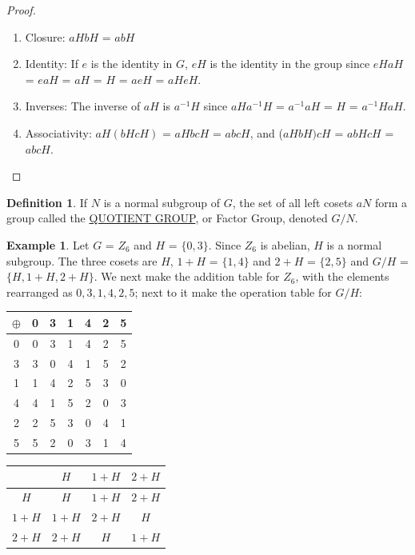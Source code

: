 \documentclass[12pt]{book}
\theoremstyle{definition}
\newtheorem{definition}{Definition}
\newtheorem{example}{Example}
\begin{document}
\begin{proof}
~

  \begin{enumerate}
  \item

  Closure: $aHbH$ = $abH$
  \item

  Identity: If $e$ is the identity in $G$, $eH$ is the identity in the  group since $eHaH$ = $eaH$ = $aH$ = $H$ = $aeH$ = $aH eH$.
  \item

  Inverses: The inverse of $aH$ is $a^{-1}H$ since $aHa^{-1}H$ = $a^{-1}aH$ = $H$ = $a^{-1}HaH$.
  \item

  Associativity: $aH(bHcH)$ = $aHbcH$ = $abcH$, and ($aHbH)cH$ = $abHcH$ = $abcH$.
  \end{enumerate}
 \end{proof}

\begin{definition} If $N$ is a normal subgroup of $G$, the set of all left cosets $aN$ form a group called the \underline{QUOTIENT GROUP}, or Factor Group, denoted $G/N$.
 \end{definition}

\begin{example} Let $G$ = $Z_6$ and $H$ = $\{0,3\}$. Since $Z_6$ is abelian, $H$ is a normal subgroup. The three cosets are $H$, $1+H$ = $\{1,4\}$ and $2+H$ = $\{2,5\}$ and $G/H$ = $\{H, 1+H, 2+H\}$.
    We next make the addition table for $Z_6$, with the elements rearranged as $0, 3, 1, 4, 2, 5$; next to it  make the operation table for $G/H$:
\end{example}


    \begin{center}
        \begin{tabular}{c||cc|cc|cc}
            $\oplus$ & 0 & 3 & 1 & 4 & 2 & 5 \\ \hline\hline
            0 & 0 & 3 & 1 & 4 & 2 & 5 \\
            3 & 3 & 0 & 4 & 1 & 5 & 2 \\ \hline
            1 & 1 & 4 & 2 & 5 & 3 & 0 \\
            4 & 4 & 1 & 5 & 2 & 0 & 3 \\ \hline
            2 & 2 & 5 & 3 & 0 & 4 & 1 \\
            5 & 5 & 2 & 0 & 3 & 1 & 4
        \end{tabular}
        \qquad\qquad
        \begin{tabular}{c | c c c}
             & $H$ & $1+H$ & $2+H$ \\ \hline
         $H$ & $H$ & $1+H$ & $2+H$ \\
         $1+H$ & $1+H$ & $2+H$ & $H$ \\
         $2+H$ & $2+H$ & $H$ & $1+H$
        \end{tabular}
    \end{center}
\end{document}
